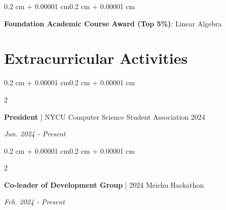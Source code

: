 \documentclass[10pt, letterpaper]{article}
\newenvironment{highlights}{
    \begin{itemize}[
        topsep=0.10 cm,
        parsep=0.10 cm,
        partopsep=0pt,
        itemsep=0pt,
        leftmargin=0.4 cm + 10pt
    ]
}{
    \end{itemize}
}
\newenvironment{onecolentry}{
    \begin{adjustwidth}{0.2 cm + 0.00001 cm}{0.2 cm + 0.00001 cm}
}{
    \end{adjustwidth}
}
\newenvironment{twocolentry}[2][]{
    \onecolentry
    \def\secondColumn{#2}
    \setcolumnwidth{\fill, 4.5 cm}
    \begin{paracol}{2}
}{
    \switchcolumn \raggedleft \secondColumn
    \end{paracol}
    \endonecolentry
}
\let\hrefWithoutArrow\href
\renewcommand{\href}[2]{\hrefWithoutArrow{#1}{\ifthenelse{\equal{#2}{}}{ }{#2 }\raisebox{.15ex}{\footnotesize \faExternalLink*}}}
\begin{document}
        \vspace{0.15 cm}
        \begin{onecolentry}
            \textbf{Foundation Academic Course Award (Top 5\%)}: Linear Algebra
        \end{onecolentry}

    \section{Extracurricular Activities}

        \begin{twocolentry}{\textit{Jun. 2024 - Present}}
                \textbf{President} | NYCU Computer Science Student Association 2024
        \end{twocolentry}
        
        
        \vspace{0.15 cm}
        \begin{twocolentry}{\textit{Feb. 2024 - Present}}
                \textbf{Co-leader of Development Group} | 2024 Meichu Hackathon
        \end{twocolentry}
    
\end{document}
